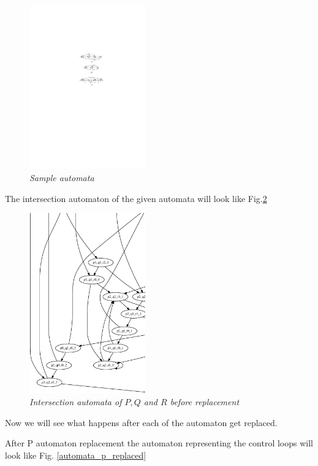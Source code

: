\begin{figure}
\begin{center}
\includegraphics[width=50mm]{Automaton_original.pdf}
\end{center}
\caption{{\em Sample automata}}
\label{automata_orginal}
\end{figure}

The intersection automaton of the given automata will look like Fig.\ref{graph_orginal}

\begin{figure}
\begin{center}
\includegraphics[width=50mm]{graph_original.eps}
\end{center}
\caption{{\em Intersection automata of $P, Q$ and $R$ before replacement}}
\label{graph_orginal}
\end{figure}

Now we will see  what happens after each of the automaton get replaced.

After P automaton replacement the automaton representing the control 
loops will look like Fig. \ref{automata_p_replaced}

